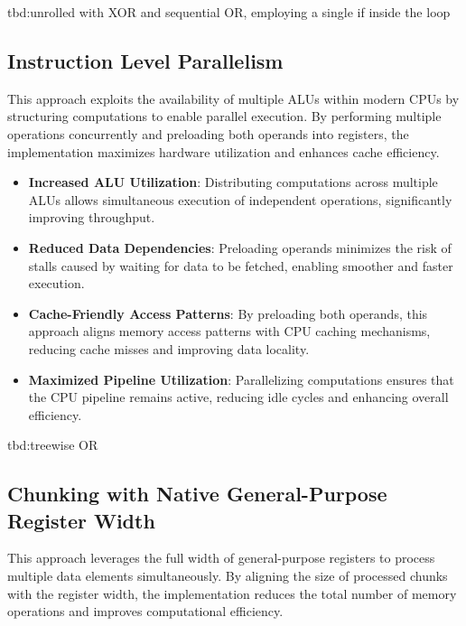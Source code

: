 \documentclass{article}
\begin{document}
tbd:unrolled with XOR and sequential OR, employing a single if inside the loop

\subsection{Instruction Level Parallelism}

This approach exploits the availability of multiple ALUs within modern CPUs by structuring computations to enable parallel execution. By performing multiple operations concurrently and preloading both operands into registers, the implementation maximizes hardware utilization and enhances cache efficiency.

\begin{itemize}
  \item \textbf{Increased ALU Utilization}: Distributing computations across multiple ALUs allows simultaneous execution of independent operations, significantly improving throughput.
  \item \textbf{Reduced Data Dependencies}: Preloading operands minimizes the risk of stalls caused by waiting for data to be fetched, enabling smoother and faster execution.
  \item \textbf{Cache-Friendly Access Patterns}: By preloading both operands, this approach aligns memory access patterns with CPU caching mechanisms, reducing cache misses and improving data locality.
  \item \textbf{Maximized Pipeline Utilization}: Parallelizing computations ensures that the CPU pipeline remains active, reducing idle cycles and enhancing overall efficiency.
\end{itemize}

tbd:treewise OR

\subsection{Chunking with Native General-Purpose Register Width}

This approach leverages the full width of general-purpose registers to process multiple data elements simultaneously. By aligning the size of processed chunks with the register width, the implementation reduces the total number of memory operations and improves computational efficiency.
\end{document}
